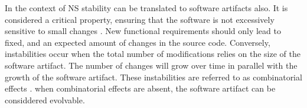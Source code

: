 In the context of NS stability can be translated to software artifacts also. It is
considered a critical property, ensuring that the software is not excessively sensitive to
small changes \autocite[270]{mannaert_normalized_2016}. New functional requirements should
only lead to fixed, and an expected amount of changes in the source code. Conversely,
instabilities occur when the total number of modifications relies on the size of the
software artifact. The number of changes will grow over time in parallel with the growth
of the software artifact. These instabilities are referred to as combinatorial effects
\autocite[270]{mannaert_normalized_2016}. when combinatorial effects are absent, the
software artifact can be considdered evolvable.